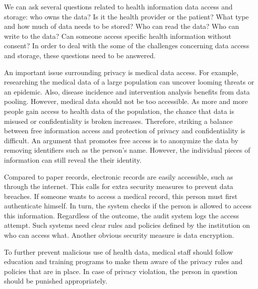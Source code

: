     We can ask several questions related to health information data access and storage: who owns the data? Is it the health provider or the patient? What type and how much of data needs to be stored? Who can read the data? Who can write to the data? Can someone access specific health information without consent? In order to deal with the some of the challenges concerning data access and storage, these questions need to be answered\cite{meingast2006security}.

    An important issue surrounding privacy is medical data access. For example, researching the medical data of a large population can uncover looming threats or an epidemic. Also, disease incidence and intervention analysis benefits from data pooling. However, medical data should not be too accessible. As more and more people gain access to health data of the population, the chance that data is misused or confidentiality is broken increases. Therefore, striking a balance between free information access and protection of privacy and confidentiality is difficult. An argument that promotes free access is to anonymize the data by removing identifiers such as the person's name. However, the individual pieces of information can still reveal the their identity.

    Compared to paper records, electronic records are easily accessible, such as through the internet. This calls for extra security measures to prevent data breaches. If someone wants to access a medical record, this person must first authenticate himself. In turn, the system checks if the person is allowed to access this information. Regardless of the outcome, the audit system logs the access attempt. Such systems need clear rules and policies defined by the institution on who can access what. Another obvious security measure is data encryption.

    To further prevent malicious use of health data, medical staff should follow education and training programs to make them aware of the privacy rules and policies that are in place. In case of privacy violation, the person in question should be punished appropriately.